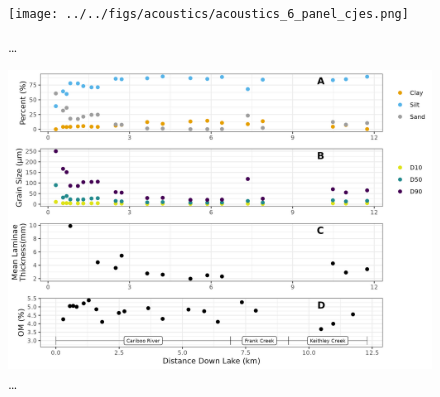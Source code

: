 \documentclass[
  letterpaper,
  DIV=11,
  numbers=noendperiod]{scrartcl}
\begin{document}
\begin{figure}

{\centering \texttt{[image: ../../figs/acoustics/acoustics\_6\_panel\_cjes.png]}

}

\caption{\label{fig-acoustics}\ldots{}}

\end{figure}

\begin{figure}

{\centering \includegraphics[width=1\textwidth,height=\textheight]{figs/ekman_seds.jpg}

}

\caption{\label{fig-ekmanSeds}\ldots{}}

\end{figure}
\end{document}
